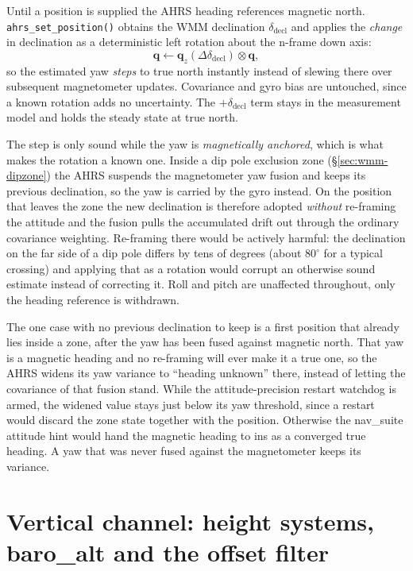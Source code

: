 \documentclass[11pt,a4paper]{article}
\newcommand{\vect}[1]{\bm{#1}}
\newcommand{\code}[1]{\texttt{#1}}
\begin{document}
Until a position is supplied the AHRS heading references magnetic
north. \code{ahrs\_\allowbreak{}set\_\allowbreak{}position()} obtains the WMM declination
$\delta_{\text{decl}}$ and applies the \emph{change} in declination as a
deterministic left rotation about the n-frame down axis:
\begin{equation}
  \vect{q} \leftarrow \vect{q}_z(\Delta\delta_{\text{decl}})
    \otimes \vect{q},
\end{equation}
so the estimated yaw \emph{steps} to true north instantly instead of
slewing there over subsequent magnetometer updates. Covariance and gyro
bias are untouched, since a known rotation adds no uncertainty. The
$+\delta_{\text{decl}}$ term stays in the measurement model and holds the
steady state at true north.

The step is only sound while the yaw is \emph{magnetically anchored},
which is what makes the rotation a known one. Inside a dip pole
exclusion zone (\S\ref{sec:wmm-dipzone}) the AHRS suspends the magnetometer
yaw fusion and keeps its previous declination, so the yaw is carried by
the gyro instead. On the position that leaves the zone the new
declination is therefore adopted \emph{without} re-framing the
attitude and the fusion pulls the accumulated drift out through the
ordinary covariance weighting. Re-framing there would be actively
harmful: the declination on the far side of a dip pole differs by tens
of degrees (about $80^\circ$ for a typical crossing) and applying that
as a rotation would corrupt an otherwise sound estimate instead of
correcting it. Roll and pitch are unaffected throughout, only the heading
reference is withdrawn.

The one case with no previous declination to keep is a first position
that already lies inside a zone, after the yaw has been fused against
magnetic north. That yaw is a magnetic heading and no re-framing will
ever make it a true one, so the AHRS widens its yaw variance to
``heading unknown'' there, instead of letting the covariance of that
fusion stand. While the attitude-precision restart watchdog is armed, the
widened value stays just below its yaw threshold, since a restart would
discard the zone state together with the position. Otherwise the nav\_suite
attitude hint would hand the magnetic heading to ins as a converged true
heading. A yaw that was never fused against the magnetometer keeps its
variance.

\section{Vertical channel: height systems, baro\_alt and the offset filter}
\end{document}
